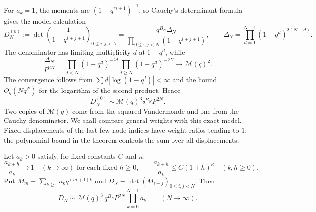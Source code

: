 \documentclass[11pt]{article}
\begin{document}
For $a_k=1$, the moments are $(1-q^{m+1})^{-1}$, so Cauchy's
determinant formula gives the model calculation
\begin{equation}\label{long1049:eq:cauchy-model}
 D_N^{(0)}:=\det\left(\frac1{1-q^{i+j+1}}\right)_{0\le i,j<N}
 =\frac{q^{B_N}\Delta_N}{\prod_{0\le i,j<N}(1-q^{i+j+1})},
 \qquad
 \Delta_N=\prod_{d=1}^{N-1}(1-q^d)^{2(N-d)}.
\end{equation}
The denominator has limiting multiplicity $d$ at $1-q^d$, while
\[
 \frac{\Delta_N}{P^{2N}}
 =\prod_{d<N}(1-q^d)^{-2d}\prod_{d\ge N}(1-q^d)^{-2N}
 \longrightarrow\mathcal M(q)^2.
\]
The convergence follows from $\sum d|\log(1-q^d)|<\infty$ and the
bound $O_q(Nq^N)$ for the logarithm of the second product. Hence
\begin{equation}\label{long1049:eq:cauchy-model-limit}
 D_N^{(0)}\sim\mathcal M(q)^3q^{B_N}P^{2N}.
\end{equation}
Two copies of $\mathcal M(q)$ come from the squared Vandermonde
and one from the Cauchy denominator. We shall compare general
weights with this exact model. Fixed displacements of the last
few node indices have weight ratios tending to $1$; the polynomial
bound in the theorem controls the sum over all displacements.

\begin{theorem}
\label{long1049:thm:geometric-universality}
Let $a_k>0$ satisfy, for fixed constants $C$ and $\kappa$,
\[
 \frac{a_{k+h}}{a_k}\longrightarrow1\quad(k\to\infty)
 \text{ for each fixed }h\ge0,
 \qquad
 \frac{a_{k+h}}{a_k}\le C(1+h)^\kappa\quad(k,h\ge0).
\]
Put $M_m=\sum_{k\ge0}a_kq^{(m+1)k}$ and $D_N=\det(M_{i+j})_{0\le i,j<N}$. Then
\[
 D_N\sim\mathcal M(q)^3\,q^{B_N}P^{2N}\prod_{k=0}^{N-1}a_k
 \qquad(N\to\infty).
\]
\end{theorem}
\end{document}
